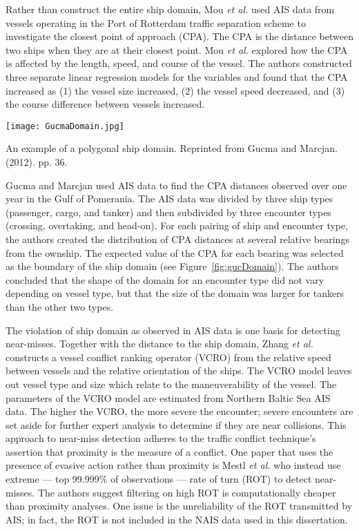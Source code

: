 \documentclass[twoside,symmetric,notoc]{tufte-book}
\newcommand{\etal}{\textit{et al.}\xspace}
\begin{document}
\par{%
Rather than construct the entire ship domain, Mou \etal\cite{Mou_2010} used AIS data from vessels operating in the Port of Rotterdam traffic separation scheme to investigate the closest point of approach (CPA). The CPA is the distance between two ships when they are at their closest point. Mou \etal explored how the CPA is affected by the length, speed, and course of the vessel. The authors constructed three separate linear regression models for the variables and found that the CPA increased as (1) the vessel size increased, (2) the vessel speed decreased, and (3) the course difference between vessels increased. 
}
\par{%
\begin{marginfigure}
\centering
	\texttt{[image: GucmaDomain.jpg]}
	\caption[An example of a polygonal ship domain.]{An example of a polygonal ship domain. Reprinted from Gucma and Marcjan. (2012). pp. 36.}
	\label{fig:gucDomain}
	\forcerectofloat
\end{marginfigure}
Gucma and Marcjan\cite{Gucma} used AIS data to find the CPA distances observed over one year in the Gulf of Pomerania. The AIS data was divided by three ship types (passenger, cargo, and tanker) and then subdivided by three encounter types (crossing, overtaking, and head-on). For each pairing of ship and encounter type, the authors created the distribution of CPA distances at several relative bearings from the ownship. The expected value of the CPA for each bearing was selected as the boundary of the ship domain (see Figure~\ref{fig:gucDomain}). The authors concluded that the shape of the domain for an encounter type did not vary depending on vessel type, but that the size of the domain was larger for tankers than the other two types.
}
\par{%
The violation of ship domain as observed in AIS data is one basis for detecting near-misses. Together with the distance to the ship domain, Zhang \etal constructs a vessel conflict ranking operator (VCRO) from the relative speed between vessels and the relative orientation of the ships. The VCRO model leaves out vessel type and size which relate to the maneuverability of the vessel. The parameters of the VCRO model are estimated from Northern Baltic Sea AIS data. The higher the VCRO, the more severe the encounter; severe encounters are set aside for further expert analysis to determine if they are near collisions.\cite{Zhang} This approach to near-miss detection adheres to the traffic conflict technique's assertion that proximity is the measure of a conflict. One paper that uses the presence of evasive action rather than proximity is Mestl \etal who instead use extreme --- top 99.999\% of observations --- rate of turn (ROT) to detect near-misses.\cite{Mestl} The authors suggest filtering on high ROT is computationally cheaper than proximity analyses. One issue is the unreliability of the ROT transmitted by AIS; in fact, the ROT is not included in the NAIS data used in this dissertation.
}
\end{document}
